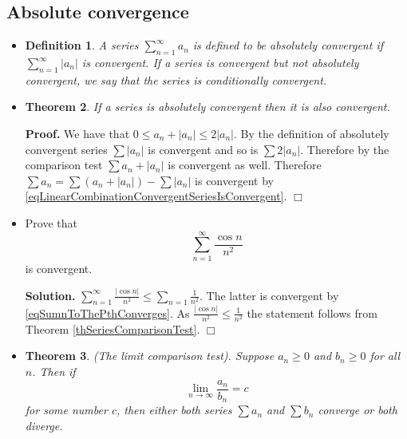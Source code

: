 \documentclass[12pt]{book}
\newenvironment{proof}[1][]{ \textbf{Proof#1.} }{$\Box$\medskip}
\newenvironment{solution}{\textbf{Solution.} }{$\Box$}
\newtheorem{theorem}{Theorem}[section]
\newtheorem{definition}[theorem]{Definition}
\begin{document}
\subsection{Absolute convergence}
\begin{itemize}

\item 
\begin{definition}
A series $\sum_{n=1}^\infty a_n$ is defined to be \emph{absolutely convergent} if $\sum_{n=1}^\infty |a_n|$ is convergent.  If a series is convergent but not absolutely convergent, we say that the series is \emph{conditionally convergent}. 
\end{definition}

\item 
\begin{theorem} \label{thAbsoluteConvergenceImpliesConvergence}
If a series is absolutely convergent then it is also convergent. 
\end{theorem}

\begin{proof}
We have that $0\leq a_n+|a_n|\leq 2|a_n|$. By the definition of absolutely convergent series $\sum |a_n|$ is convergent and so is $\sum 2|a_n|$. Therefore by the comparison test $\sum a_n+|a_n|$ is convergent as well. Therefore $\sum a_n= \sum (a_n+|a_n|)-\sum |a_n|$  is convergent by \eqref{eqLinearCombinationConvergentSeriesIsConvergent}.
\end{proof}
\item Prove that 
\[
\sum_{n=1}^{\infty} \frac{\cos n}{n^2}
\]
is convergent.

\begin{solution}
$\sum\limits_{n=1}^{\infty} \frac{|\cos n |}{n^2} \leq \sum\limits_{n=1}\frac{1}{n^2}$. The latter is convergent by \eqref{eqSumnToThePthConverges}. As $\frac{|\cos n|}{n^2}\leq \frac{1}{n^2}$ the statement follows from Theorem \ref{thSeriesComparisonTest}.
\end{solution}


\item 
\begin{theorem}\label{thSeriesTwoSeriesRatioTest}
(The limit comparison test). Suppose $a_n\geq 0$ and $b_n\geq 0$ for all $n$. Then if 
\[\lim\limits_{n\to \infty} \frac{a_n}{b_n}= c 
\]
for some number $c$, then either both series $\sum a_n$ and $\sum b_n $ converge or both diverge.
\end{theorem}


\end{itemize}
\end{document}
